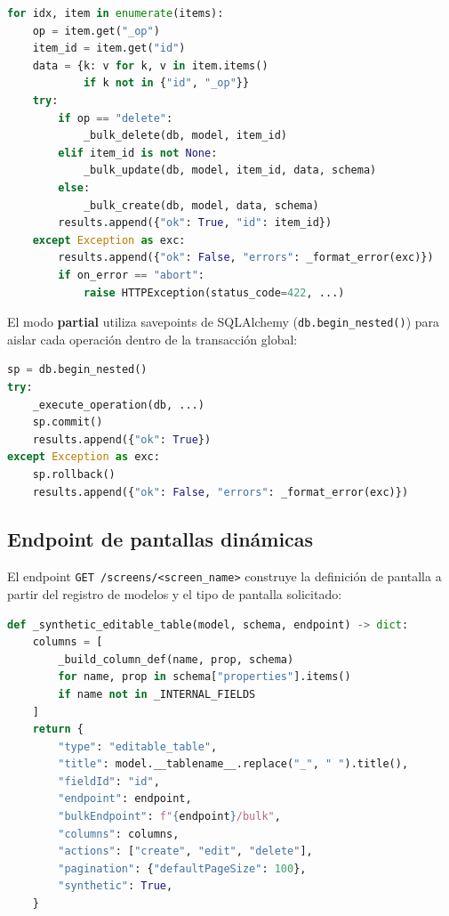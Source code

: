 \begin{lstlisting}[language=Python, caption={Lógica de clasificación de operaciones bulk.}]
for idx, item in enumerate(items):
    op = item.get("_op")
    item_id = item.get("id")
    data = {k: v for k, v in item.items()
            if k not in {"id", "_op"}}
    try:
        if op == "delete":
            _bulk_delete(db, model, item_id)
        elif item_id is not None:
            _bulk_update(db, model, item_id, data, schema)
        else:
            _bulk_create(db, model, data, schema)
        results.append({"ok": True, "id": item_id})
    except Exception as exc:
        results.append({"ok": False, "errors": _format_error(exc)})
        if on_error == "abort":
            raise HTTPException(status_code=422, ...)
\end{lstlisting}

El modo \textbf{partial} utiliza savepoints de SQLAlchemy
(\texttt{db.begin\_nested()}) para aislar cada operación dentro de la transacción
global:

\begin{lstlisting}[language=Python, caption={Uso de savepoints para el modo partial.}]
sp = db.begin_nested()
try:
    _execute_operation(db, ...)
    sp.commit()
    results.append({"ok": True})
except Exception as exc:
    sp.rollback()
    results.append({"ok": False, "errors": _format_error(exc)})
\end{lstlisting}

\subsection{Endpoint de pantallas dinámicas}
\label{subsec:impl-screens}

El endpoint \texttt{GET /screens/<screen\_name>} construye la definición de pantalla
a partir del registro de modelos y el tipo de pantalla solicitado:

\begin{lstlisting}[language=Python, caption={Generación de una pantalla de tipo editable\_table.}]
def _synthetic_editable_table(model, schema, endpoint) -> dict:
    columns = [
        _build_column_def(name, prop, schema)
        for name, prop in schema["properties"].items()
        if name not in _INTERNAL_FIELDS
    ]
    return {
        "type": "editable_table",
        "title": model.__tablename__.replace("_", " ").title(),
        "fieldId": "id",
        "endpoint": endpoint,
        "bulkEndpoint": f"{endpoint}/bulk",
        "columns": columns,
        "actions": ["create", "edit", "delete"],
        "pagination": {"defaultPageSize": 100},
        "synthetic": True,
    }
\end{lstlisting}

